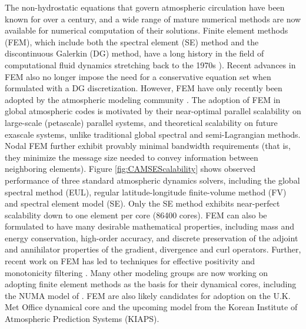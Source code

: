 \documentclass[11pt]{article}
\begin{document}
The non-hydrostatic equations that govern atmospheric circulation have been known for over a century, and a wide range of mature numerical methods are now available for numerical computation of their solutions.  Finite element methods (FEM), which include both the spectral element (SE) method and the discontinuous Galerkin (DG) method, have a long history in the field of computational fluid dynamics stretching back to the 1970s \cite{patera:84,maday1989spectral,FBSR1997JCP,BCCWS1998JCP}).  Recent advances in FEM \cite{huynh2007flux, ullrich2014global} also no longer impose the need for a conservative equation set when formulated with a DG discretization.  However, FEM have only recently been adopted by the atmospheric modeling community \cite{taylor:97,FXGJSHTW2002JCP,FXGTER2004MWR,AFMTJT2004MWR,NTL2005MWR,FXGMR2008JCP,JFKFXG2012JCP}.  The adoption of FEM in global atmospheric codes is motivated by their near-optimal parallel scalability on large-scale (petascale) parallel systems, and theoretical scalability on future exascale systems, unlike traditional global spectral and semi-Lagrangian methods.   Nodal FEM \cite{hesthaven2007nodal} further exhibit provably minimal bandwidth requirements (that is, they minimize the message size needed to convey information between neighboring elements).  Figure \ref{fig:CAMSEScalability} shows observed performance of three standard atmospheric dynamics solvers, including the global spectral method (EUL), regular latitude-longitude finite-volume method (FV) and spectral element model (SE).  Only the SE method exhibits near-perfect scalability down to one element per core (86400 cores).  FEM can also be formulated to have many desirable mathematical properties, including mass and energy conservation, high-order accuracy, and discrete preservation of the adjoint and annihilator properties of the gradient, divergence and curl operators.  Further, recent work on FEM has led to techniques for effective positivity and monotonicity filtering \cite{OGMATASC2013}.  Many other modeling groups are now working on adopting finite element methods as the basis for their dynamical cores, including the NUMA model of \cite{JFKFXG2012JCP}.  FEM are also likely candidates for adoption on the U.K. Met Office dynamical core and the upcoming model from the Korean Institute of Atmospheric Prediction Systems (KIAPS).
\end{document}
